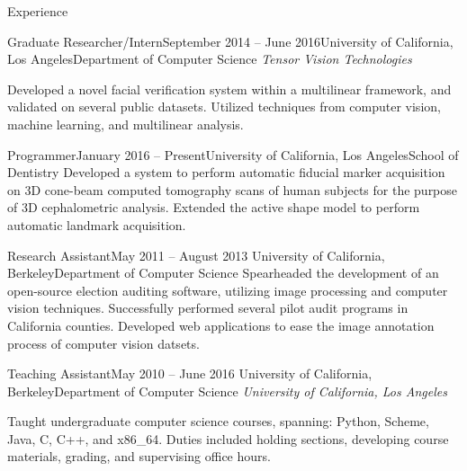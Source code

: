 \documentclass{resume}
\begin{document}
\begin{component}{Experience}
	\begin{position}{Graduate Researcher/Intern}{September 2014 -- June 2016}{University of California, Los Angeles}{Department of Computer Science}
	\emph{Tensor Vision Technologies}

		Developed a novel facial verification system within a multilinear framework, and validated on several public datasets.
Utilized techniques from computer vision, machine learning, and multilinear analysis.
	\end{position}

    \begin{position}{Programmer}{January 2016 -- Present}{University of California, Los Angeles}{School of Dentistry}
      Developed a system to perform automatic fiducial marker acquisition on 3D cone-beam computed tomography scans of human subjects for the purpose of 3D cephalometric analysis.
      Extended the active shape model to perform automatic landmark acquisition.
      \end{position}

	\begin{position}{Research Assistant}{May 2011 -- August 2013}
	 	{University of California, Berkeley}{Department of Computer Science}
	{Spearheaded the development of an open-source election auditing software,
     utilizing image processing and computer vision techniques. 
     Successfully performed
         several pilot audit programs in California counties.
     Developed web applications to ease the image annotation process of
     computer vision datsets.}
	\end{position}

	\begin{position}{Teaching Assistant}{May 2010 -- June 2016}
		{University of California, Berkeley}{Department of Computer Science}
    \emph{University of California, Los Angeles}

	{Taught undergraduate computer science courses, spanning: Python, Scheme, Java, C, C++, and x86\_64.
	 Duties included holding sections, developing course materials, grading, and supervising office hours.}
	\end{position}
\end{component}

\vspace{-0.5em}
\end{document}
